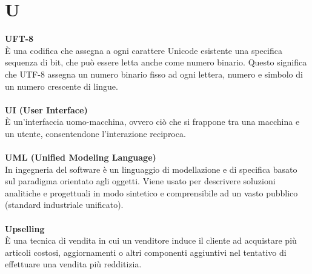 \section{U}
\textbf{UFT-8}\\
È una codifica che assegna a ogni carattere Unicode esistente una specifica sequenza di bit, che può essere letta anche come numero binario. Questo significa che UTF-8 assegna un numero binario fisso ad ogni lettera, numero e simbolo di un numero crescente di lingue. \\ \\
\textbf{UI (User Interface)}\\
È un'interfaccia uomo-macchina, ovvero ciò che si frappone tra una macchina e un utente, consentendone l'interazione reciproca. \\ \\
\textbf{UML (Unified Modeling Language)}\\
In ingegneria del software è un linguaggio di modellazione e di specifica basato sul paradigma orientato agli oggetti. Viene usato per descrivere soluzioni analitiche e progettuali in modo sintetico e comprensibile ad un vasto pubblico (standard industriale unificato). \\ \\
\textbf{Upselling}\\
È una tecnica di vendita in cui un venditore induce il cliente ad acquistare più articoli costosi, aggiornamenti o altri componenti aggiuntivi nel tentativo di effettuare una vendita più redditizia. \\ \\
\clearpage